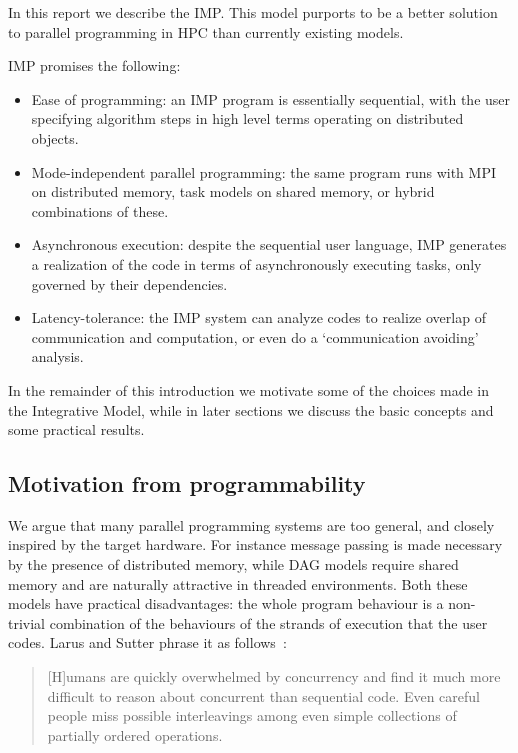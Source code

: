 In this report we describe the \acf{IMP}. This model purports
to be a better solution to parallel programming in HPC
than currently existing models.

IMP promises the following:
\begin{itemize}
\item Ease of programming: an IMP program is essentially sequential,
  with the user specifying algorithm steps in high level terms
  operating on distributed objects.
\item Mode-independent parallel programming: the same program runs
  with MPI on distributed memory, task models on shared memory,
  or hybrid combinations of these.
\item Asynchronous execution: despite the sequential user language,
  IMP generates a realization of the code in terms of asynchronously
  executing tasks, only governed by their dependencies.
\item Latency-tolerance: the IMP system can analyze codes
  to realize overlap of communication and computation,
  or even do a `communication avoiding' analysis.
\end{itemize}

In the remainder of this introduction we motivate some of the
choices made in the Integrative Model,
while in later sections we discuss the basic concepts
and some practical results.

\subsection{Motivation from programmability}

We argue that many parallel programming systems are too general,
and closely inspired by the target hardware.
For instance message passing
is made necessary by the presence of distributed memory,
while \ac{DAG} models require shared memory and
are naturally attractive in threaded environments.
Both these models have practical disadvantages:
the whole program behaviour is a non-trivial
combination of the behaviours of the strands of execution
that the user codes. Larus and Sutter phrase it as follows~\cite{Sutter_2005}:
\begin{quotation}
    [H]umans are quickly overwhelmed by concurrency and find it much more
    difficult to reason about concurrent than sequential code. Even
    careful people miss possible interleavings among even simple
    collections of partially ordered operations.
\end{quotation}

